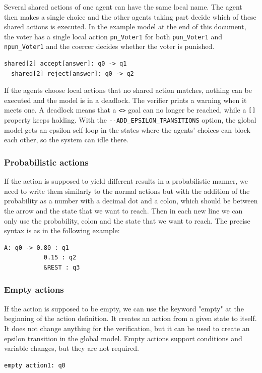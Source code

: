 \documentclass[12pt]{article}
\begin{document}
Several shared actions of one agent can have the same local name. The agent then makes a single choice and the other agents taking part decide which of these shared actions is executed. In the example model at the end of this document, the voter has a single local action \verb+pn_Voter1+ for both \verb+pun_Voter1+ and \verb+npun_Voter1+ and the coercer decides whether the voter is punished.
\begin{lstlisting}[title={The agent chooses answer and the other agent decides whether accept or reject is executed.}]
  shared[2] accept[answer]: q0 -> q1
  shared[2] reject[answer]: q0 -> q2
\end{lstlisting}

If the agents choose local actions that no shared action matches, nothing can be executed and the model is in a deadlock. The verifier prints a warning when it meets one. A deadlock means that a \verb+<>+ goal can no longer be reached, while a \verb+[]+ property keeps holding. With the \verb+--ADD_EPSILON_TRANSITIONS+ option, the global model gets an epsilon self-loop in the states where the agents' choices can block each other, so the system can idle there.

\subsubsection{Probabilistic actions}
If the action is supposed to yield different results in a probabilistic manner, we need to write them similarly to the normal actions but with the addition of the probability as a number with a decimal dot and a colon, which should be between the arrow and the state that we want to reach. Then in each new line we can only use the probability, colon and the state that we want to reach. The precise syntax is as in the following example:
\begin{lstlisting}[title={Action A that leads from a state q0 to q1 with a probability of 0.8, to q2 with a probability of 0.15 and to q3 with a probability signified by a keyword $\&REST$ which signifies the leftover probability, which in this case would be equal to 0.05.}]
  A: q0 -> 0.80 : q1
           0.15 : q2
           &REST : q3
\end{lstlisting}

\subsubsection{Empty actions}
If the action is supposed to be empty, we can use the keyword "empty" at the beginning of the action definition. It creates an action from a given state to itself. It does not change anything for the verification, but it can be used to create an epsilon transition in the global model. Empty actions support conditions and variable changes, but they are not required.
\begin{lstlisting}[title={When an action is supposed to be empty, we can use the keyword "empty" at the beginning of the action definition. It creates an action1 from state q0 to q0.}]
  empty action1: q0
\end{lstlisting}
\end{document}
